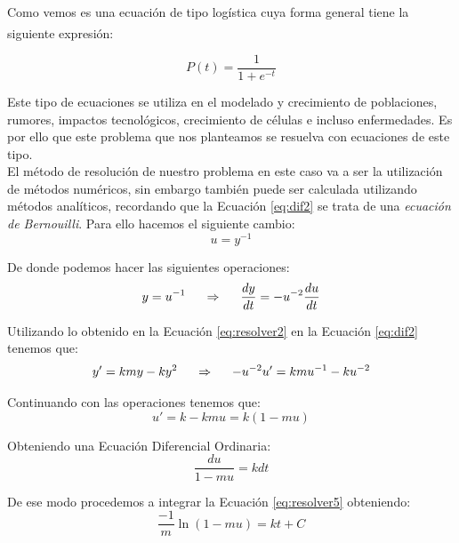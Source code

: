\documentclass[a4paper,11pt]{article}
\numberwithin{equation}{section}
\begin{document}
\indent Como vemos es una ecuación de tipo logística cuya forma general tiene la siguiente expresión{\tiny \bf \textsuperscript{\cite{wikidos}}}:

\begin{equation}
P(t)=\frac{1}{1+e^{-t}}
\label{eq:logis}
\end{equation}

\indent Este tipo de ecuaciones se utiliza en el modelado y crecimiento de poblaciones, rumores, impactos tecnológicos, crecimiento de células e incluso enfermedades. Es por ello que este problema que nos planteamos se resuelva con ecuaciones de este tipo. \\
 
\indent El método de resolución de nuestro problema en este caso va a ser la utilización de métodos numéricos, sin embargo también puede ser calculada utilizando métodos analíticos, recordando que la Ecuación \ref{eq:dif2} se trata de una \textit{ecuación de Bernouilli}. Para ello hacemos el siguiente cambio:
\begin{equation}
u=y^{-1}
\label{eq:resolver1}
\end{equation}

\indent De donde podemos hacer las siguientes operaciones:
\begin{equation}
y=u^{-1} \hspace{0.5cm} \Rightarrow \hspace{0.5cm} \frac{dy}{dt}=-u^{-2}\frac{du}{dt}
\label{eq:resolver2}
\end{equation}

\indent Utilizando lo obtenido en la Ecuación \ref{eq:resolver2} en la Ecuación \ref{eq:dif2} tenemos que:
\begin{equation}
y'=kmy-ky^2 \hspace{0.5cm} \Rightarrow \hspace{0.5cm} -u^{-2}u'=kmu^{-1}-ku^{-2}
\label{eq:resolver3}
\end{equation}

\indent Continuando con las operaciones tenemos que:
\begin{equation}
u'=k-kmu=k(1-mu)
\label{eq:resolver4} 
\end{equation}

\indent Obteniendo una Ecuación Diferencial Ordinaria:
\begin{equation}
\frac{du}{1-mu}=kdt
\label{eq:resolver5}
\end{equation}

\indent De ese modo procedemos a integrar la Ecuación \ref{eq:resolver5} obteniendo:
\begin{equation}
 \frac{-1}{m}\ln(1-mu)=kt+C
 \label{eq:resolver6}
\end{equation}
\end{document}
